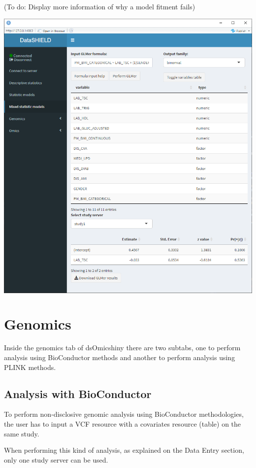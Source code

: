 \documentclass[
]{book}
\begin{document}
(To do: Display more information of why a model fitment fails)

\includegraphics{images/stat_models2.png}

\hypertarget{genomics}{%
\section{Genomics}\label{genomics}}

Inside the genomics tab of dsOmicshiny there are two subtabs, one to perform analysis using BioConductor methods and another to perform analysis using PLINK methods.

\hypertarget{analysis-with-bioconductor}{%
\subsection{Analysis with BioConductor}\label{analysis-with-bioconductor}}

To perform non-disclosive genomic analysis using BioConductor methodologies, the user has to input a VCF resource with a covariates resource (table) on the same study.

When performing this kind of analysis, as explained on the Data Entry section, only one study server can be used.
\end{document}

